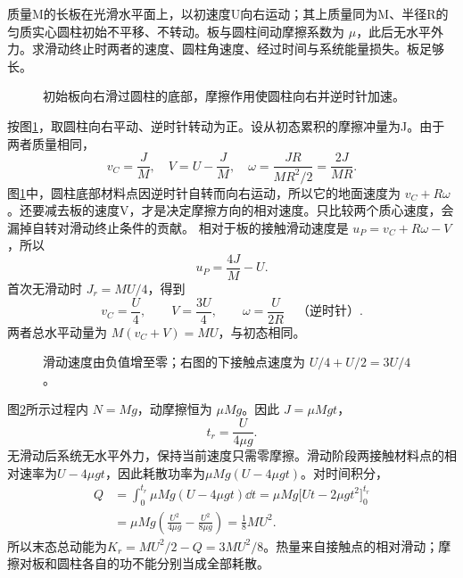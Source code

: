 \begin{exercise}[突然获得速度的板]\label{deep6:problem-exercise-7}\label{deep6:ex:d5-h7}
质量M的长板在光滑水平面上，以初速度U向右运动；其上质量同为M、半径R的匀质实心圆柱初始不平移、不转动。板与圆柱间动摩擦系数为 $\mu$，此后无水平外力。求滑动终止时两者的速度、圆柱角速度、经过时间与系统能量损失。板足够长。
\end{exercise}
\begin{figure}[H]\centering
{}
\caption{初始板向右滑过圆柱的底部，摩擦作用使圆柱向右并逆时针加速。}\label{deep6:fig:d5-h7-q}
\end{figure}
\begin{solution}
按图\ref{deep6:fig:d5-h7-q}，取圆柱向右平动、逆时针转动为正。设从初态累积的摩擦冲量为J。由于两者质量相同，
\[
v_C=\frac JM,\quad V=U-\frac JM,\quad
\omega=\frac{JR}{MR^2/2}=\frac{2J}{MR}.
\]
图\ref{deep6:fig:d5-h7-q}中，圆柱底部材料点因逆时针自转而向右运动，所以它的地面速度为 $v_C+R\omega$。还要减去板的速度V，才是决定摩擦方向的相对速度。只比较两个质心速度，会漏掉自转对滑动终止条件的贡献。
相对于板的接触滑动速度是 $u_P=v_C+R\omega-V$，所以
\[
u_P=\frac{4J}M-U.
\]
首次无滑动时 $J_r=MU/4$，得到
\[
v_C=\frac U4,\qquad V=\frac{3U}4,
\qquad \omega=\frac U{2R}\quad\text{（逆时针）}.
\]
两者总水平动量为 $M(v_C+V)=MU$，与初态相同。
\begin{figure}[H]\centering
{}
\caption{滑动速度由负值增至零；右图的下接触点速度为 $U/4+U/2=3U/4$。}\label{deep6:fig:d5-h7-s}
\end{figure}
图\ref{deep6:fig:d5-h7-s}所示过程内 $N=Mg$，动摩擦恒为 $\mu Mg$。因此 $J=\mu Mgt$，
\[
t_r=\frac U{4\mu g}.
\]
无滑动后系统无水平外力，保持当前速度只需零摩擦。滑动阶段两接触材料点的相对速率为$U-4\mu gt$，因此耗散功率为$\mu Mg(U-4\mu gt)$。对时间积分，
\[
\begin{aligned}
Q&=\int_0^{t_r}\mu Mg(U-4\mu gt)\dd t
=\mu Mg\bigl[Ut-2\mu gt^2\bigr]_0^{t_r}\\
&=\mu Mg\left(\frac{U^2}{4\mu g}-\frac{U^2}{8\mu g}\right)
=\frac18MU^2.
\end{aligned}
\]
所以末态总动能为$K_r=MU^2/2-Q=3MU^2/8$。热量来自接触点的相对滑动；摩擦对板和圆柱各自的功不能分别当成全部耗散。
\end{solution}


